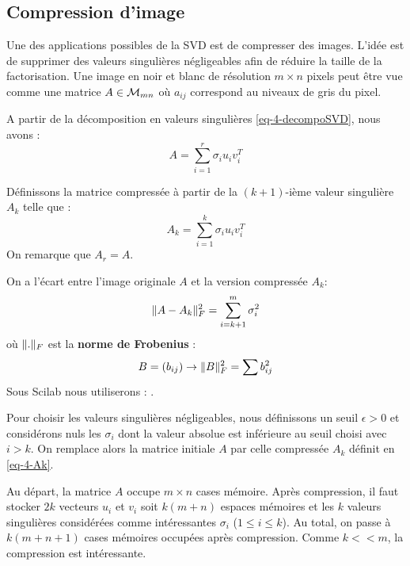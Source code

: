 	\subsection{Compression d'image}

		Une des applications possibles de la SVD est de compresser des images. L'idée est de supprimer des valeurs singulières négligeables afin de réduire la taille de la factorisation.
		Une image en noir et blanc de résolution $m\times n$ pixels peut être vue comme une matrice $A\in\mathcal{M}_{mn}$ où $a_{ij}$ correspond au niveaux de gris du pixel.

		A partir de la décomposition en valeurs singulières \eqref{eq-4-decompoSVD}, nous avons :
		$$
			A = \sum_{i=1}^r \sigma_i u_i v_i^T
		$$

		Définissons la matrice compressée à partir de la $(k+1)$-ième valeur singulière $A_k$ telle que :
		\begin{equation}
			\label{eq-4-Ak}
			A_k =  \sum_{i=1}^k \sigma_i u_i v_i^T 
		\end{equation}
		On remarque que $A_r = A$.

		On a l'écart entre l'image originale $A$ et la version compressée $A_k$:
		\begin{equation}
			\label{eq-4-ecartAk}
			\lVert A-A_k \rVert_F^2 = \sum_{i=k+1}^m \sigma_i^2
		\end{equation}
		où $\lVert . \rVert_F$ est la \textbf{norme de Frobenius} :
		$$
			B = (b_{ij}) \to \lVert B \rVert_F^2 = \sum b_{ij}^2
		$$
		Sous Scilab nous utiliserons : .

		\medskip

		Pour choisir les valeurs singulières négligeables, nous définissons un seuil $\epsilon > 0$ et considérons nuls les $\sigma_i$ dont la valeur absolue est inférieure au seuil choisi avec $i>k$. On remplace alors la matrice initiale $A$ par celle compressée $A_k$ définit en \eqref{eq-4-Ak}.

		Au départ, la matrice $A$ occupe $m\times n$ cases mémoire. Après compression, il faut stocker $2k$ vecteurs $u_i$ et $v_i$ soit $k(m +n)$ espaces mémoires et les $k$ valeurs singulières considérées comme intéressantes $\sigma_i$ ($1 \leq i \leq k$). Au total, on passe à $k(m+n+1)$ cases mémoires occupées après compression. Comme $k<<m$, la compression est intéressante.

		\medskip


